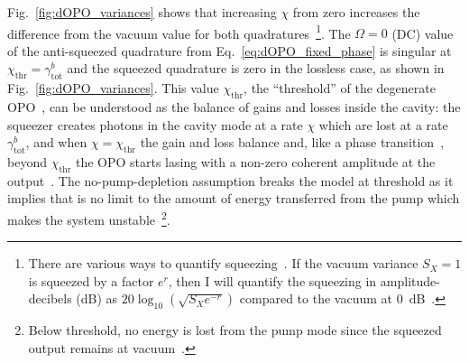 Fig.~\ref{fig:dOPO_variances} shows that increasing $\chi$ from zero increases the difference from the vacuum value for both quadratures~\footnote{There are various ways to quantify squeezing~\cite{}. If the vacuum variance $S_X=1$ is squeezed by a factor $e^r$, then I will quantify the squeezing in amplitude-decibels (dB) as $20 \log_{10}(\sqrt{S_X e^{-r}})$ compared to the vacuum at 0~dB~\cite{}.}. %
The $\Omega=0$ (DC) value of the anti-squeezed quadrature from Eq.~\ref{eq:dOPO_fixed_phase} is singular at $\chi_\text{thr}=\gamma^b_\text{tot}$ and the squeezed quadrature is zero in the lossless case, as shown in Fig.~\ref{fig:dOPO_variances}. %
This value $\chi_\text{thr}$, the ``threshold'' of the degenerate OPO~\cite{}, %
can be understood as the balance of gains and losses inside the cavity: the squeezer creates photons in the cavity mode at a rate $\chi$ which are lost at a rate $\gamma^b_\text{tot}$, and when $\chi=\chi_\text{thr}$ the gain and loss balance and, like a phase transition~\cite{}, beyond $\chi_\text{thr}$ the OPO starts lasing with a non-zero coherent amplitude at the output~\cite{}. %
The no-pump-depletion assumption breaks the model at threshold as it implies that is no limit to the amount of energy transferred from the pump which makes the system unstable~\footnote{Below threshold, no energy is lost from the pump mode since the squeezed output remains at vacuum~\cite{}.}. 
